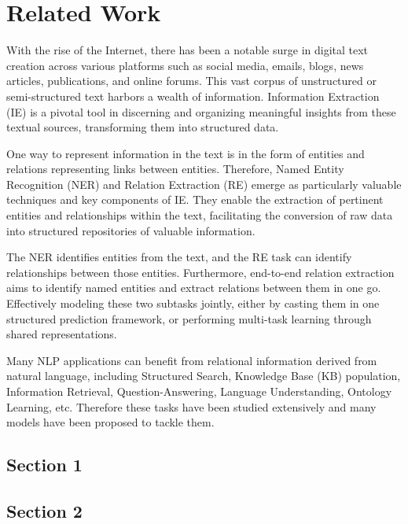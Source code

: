 \chapter{Related Work}
\label{chp:relatedWork}

With the rise of the Internet, there has been a notable surge in digital text creation across various platforms such as social media, emails, blogs, news articles, publications, and online forums. This vast corpus of unstructured or semi-structured text harbors a wealth of information. Information Extraction (IE) is a pivotal tool in discerning and organizing meaningful insights from these textual sources, transforming them into structured data.

One way to represent information in the text is in the form of entities and relations representing links between entities. Therefore, Named Entity Recognition (NER) and Relation Extraction (RE) emerge as particularly valuable techniques and key components of IE. They enable the extraction of pertinent entities and relationships within the text, facilitating the conversion of raw data into structured repositories of valuable information.

The NER identifies entities from the text, and the RE task can identify relationships between those entities. Furthermore, end-to-end relation extraction aims to identify named entities and extract relations between them in one go. Effectively modeling these two subtasks jointly\cite{Zhong2020AFE}, either by casting them in one structured prediction framework, or performing multi-task learning through shared representations.

Many NLP applications can benefit from relational information derived from natural language\cite{Goyal2018RNE}, including Structured Search, Knowledge Base (KB) population, Information Retrieval, Question-Answering, Language Understanding, Ontology Learning, etc. Therefore these tasks have been studied extensively and many models have been proposed to tackle them.
\section{Section 1}

\section{Section 2}


